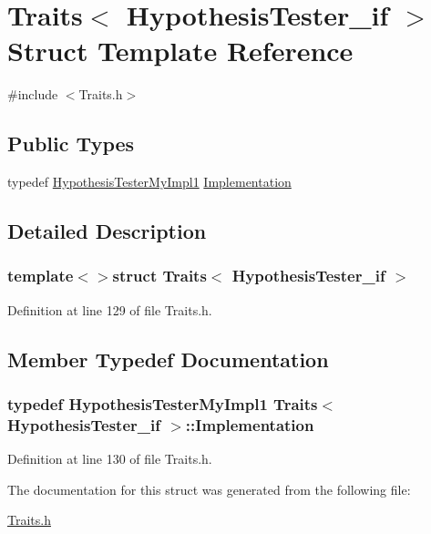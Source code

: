 \hypertarget{struct_traits_3_01_hypothesis_tester__if_01_4}{\section{Traits$<$ Hypothesis\-Tester\-\_\-if $>$ Struct Template Reference}
\label{struct_traits_3_01_hypothesis_tester__if_01_4}
}


{\ttfamily \#include $<$Traits.\-h$>$}

\subsection*{Public Types}
\begin{DoxyCompactItemize}
\item 
typedef \hyperlink{class_hypothesis_tester_my_impl1}{Hypothesis\-Tester\-My\-Impl1} \hyperlink{struct_traits_3_01_hypothesis_tester__if_01_4_a5fd3508bb7c3e86b2b16161c70eae52f}{Implementation}
\end{DoxyCompactItemize}


\subsection{Detailed Description}
\subsubsection*{template$<$$>$struct Traits$<$ Hypothesis\-Tester\-\_\-if $>$}



Definition at line 129 of file Traits.\-h.



\subsection{Member Typedef Documentation}
\hypertarget{struct_traits_3_01_hypothesis_tester__if_01_4_a5fd3508bb7c3e86b2b16161c70eae52f}{
\subsubsection[{Implementation}]{\setlength{\rightskip}{0pt plus 5cm}typedef {\bf Hypothesis\-Tester\-My\-Impl1} {\bf Traits}$<$ {\bf Hypothesis\-Tester\-\_\-if} $>$\-::{\bf Implementation}}}\label{struct_traits_3_01_hypothesis_tester__if_01_4_a5fd3508bb7c3e86b2b16161c70eae52f}


Definition at line 130 of file Traits.\-h.



The documentation for this struct was generated from the following file\-:\begin{DoxyCompactItemize}
\item 
\hyperlink{_traits_8h}{Traits.\-h}\end{DoxyCompactItemize}
